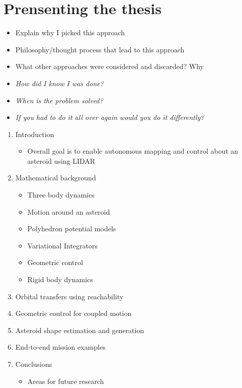 \section{Prensenting the thesis}
\begin{itemize}
    \item Explain why I picked this approach
    \item Philosophy/thought process that lead to this approach
    \item What other approaches were considered and discarded? Why
    \item \emph{How did I know I was done?}
    \item \emph{When is the problem solved?}
    \item \emph{If you had to do it all over again would you do it differently?}
\end{itemize}

\begin{enumerate}
    \item Introduction
        \begin{itemize}
            \item Overall goal is to enable autonomous mapping and control about an asteroid using LIDAR
        \end{itemize}
    \item Mathematical background
        \begin{itemize}
            \item Three body dynamics
            \item Motion around an asteroid
            \item Polyhedron potential models
            \item Variational Integrators
            \item Geometric control
            \item Rigid body dynamics
        \end{itemize}
    \item Orbital transfers using reachability
    \item Geometric control for coupled motion
    \item Asteroid shape estimation and generation
    \item End-to-end mission examples
    \item Conclusions
        \begin{itemize}
            \item Areas for future research
        \end{itemize}
\end{enumerate}

